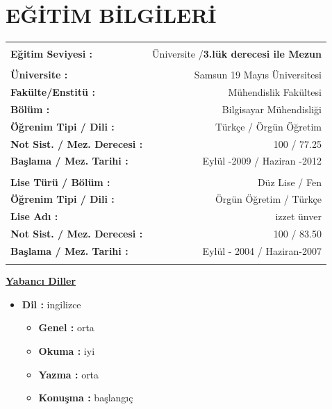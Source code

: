 \documentclass[10pt,a4paper]{article}
\begin{document}
\section{\sc E{\footnotesize Ğ\footnotesize İT\footnotesize İM} B{\footnotesize İLG\footnotesize İLER\footnotesize İ}}
\hspace*{1.6in}\begin{tabular}{lr}
\vspace{0.5 mm}\\
\textbf{Eğitim Seviyesi :} & Üniversite /\textbf{3.lük derecesi ile Mezun} \\
\vspace{0.5 mm}\\
\textbf{Üniversite :} & Samsun 19 Mayıs Üniversitesi \\
\textbf{Fakülte/Enstitü :} & Mühendislik Fakültesi \\
\textbf{Bölüm :} & Bilgisayar Mühendisliği \\
\textbf{Öğrenim Tipi / Dili :} & Türkçe / Örgün Öğretim\\
\textbf{Not Sist. / Mez. Derecesi :} & 100 / 77.25 \\
\textbf{Başlama / Mez. Tarihi :} & Eylül -2009 / Haziran -2012\\
\vspace{0.5 mm}\\
\textbf{Lise Türü / Bölüm :} & Düz Lise / Fen\\
\textbf{Öğrenim Tipi / Dili :} & Örgün Öğretim / Türkçe\\
\textbf{Lise Adı :} & izzet ünver\\
\textbf{Not Sist. / Mez. Derecesi :} & 100 / 83.50\\
\textbf{Başlama / Mez. Tarihi :} & Eylül - 2004 / Haziran-2007\\
\vspace{0.5 mm}\\
\end{tabular}

\underline{\textbf{Yabancı Diller}}
\vspace{0.5 mm}\\
\begin{itemize}
  \item{\textbf{Dil :} ingilizce}
  \begin{itemize}
    \item{\textbf{Genel :} orta}
    \item{\textbf{Okuma :} iyi}
    \item{\textbf{Yazma :} orta}
    \item{\textbf{Konuşma :} başlangıç}
  \end{itemize}
\end{itemize}
\end{document}
